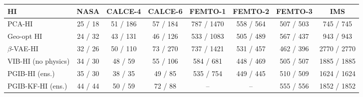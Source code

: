 \begin{tabular}{l c c c c c c c }
\hline
HI & NASA & CALCE-4 & CALCE-6 & FEMTO-1 & FEMTO-2 & FEMTO-3 & IMS \\
\hline
PCA-HI & 25 / 18 & 51 / 186 & 57 / 184 & 787 / 1470 & 558 / 564 & 507 / 503 & 745 / 745 \\
Geo-opt HI & 24 / 32 & 43 / 131 & 46 / 126 & 533 / 1083 & 505 / 489 & 567 / 437 & 943 / 943 \\
$\beta$-VAE-HI & 32 / 26 & 50 / 110 & 73 / 270 & 737 / 1421 & 531 / 457 & 462 / 396 & 2770 / 2770 \\
VIB-HI (no physics) & 34 / 30 & 48 / 59 & 55 / 106 & 584 / 681 & 448 / 469 & 505 / 507 & 1885 / 1885 \\
PGIB-HI (ens.) & 35 / 30 & 38 / 35 & 49 / 85 & 535 / 754 & 449 / 445 & 510 / 509 & 1624 / 1624 \\
PGIB-KF-HI (ens.) & 44 / 44 & 50 / 59 & 72 / 88 & -- & -- & 555 / 556 & 1852 / 1852 \\
\hline
\end{tabular}
